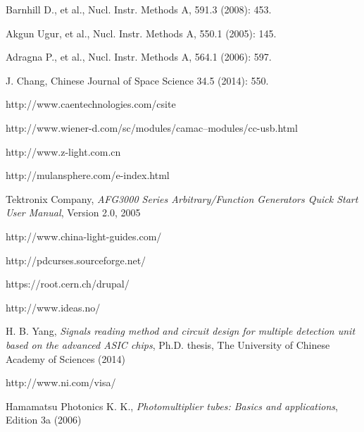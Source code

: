 \documentclass[a4paper,10pt,twoside]{cpc-hepnp}
\begin{document}
\begin{CJK*}{UTF8}{gbsn}
\begin{multicols}{2}
\begin{thebibliography}{90}
\vspace{3mm}
Barnhill D., et al., Nucl. Instr. Methods A, 591.3 (2008): 453.

Akgun Ugur, et al., Nucl. Instr. Methods A, 550.1 (2005): 145.

Adragna P., et al., Nucl. Instr. Methods A, 564.1 (2006): 597.

J. Chang, Chinese Journal of Space Science 34.5 (2014): 550.

http://www.caentechnologies.com/csite

http://www.wiener-d.com/sc/modules/camac--modules/cc-usb.html

http://www.z-light.com.cn

http://mulansphere.com/e-index.html

Tektronix Company, \emph{AFG3000 Series Arbitrary/Function Generators Quick Start User Manual}, Version 2.0, 2005

http://www.china-light-guides.com/

http://pdcurses.sourceforge.net/

https://root.cern.ch/drupal/

http://www.ideas.no/

H. B. Yang, \emph{Signals reading method and circuit design for multiple detection
unit based on the advanced ASIC chips}, Ph.D. thesis, The University of Chinese
Academy of Sciences (2014)


http://www.ni.com/visa/

Hamamatsu Photonics K. K., \emph{Photomultiplier tubes: Basics and applications},  Edition 3a (2006)

\end{thebibliography}
\end{multicols}


\end{CJK*}
\end{document}
